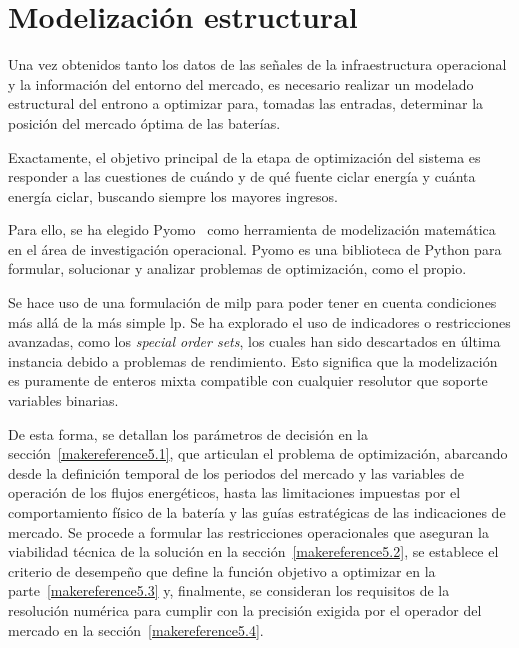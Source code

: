 
\cleardoublepage%

\chapter{Modelización estructural}%
\label{makereference5}

Una vez obtenidos tanto los datos de las señales de la infraestructura operacional y la información del entorno del mercado, es necesario realizar un modelado estructural del entrono a optimizar para, tomadas las entradas, determinar la posición del mercado óptima de las baterías.

Exactamente, el objetivo principal de la etapa de optimización del sistema es responder a las cuestiones de cuándo y de qué fuente ciclar energía y cuánta energía ciclar, buscando siempre los mayores ingresos.

Para ello, se ha elegido Pyomo~\cite{pyomo2025optimization} como herramienta de modelización matemática en el área de investigación operacional. Pyomo es una biblioteca de Python para formular, solucionar y analizar problemas de optimización, como el propio.

Se hace uso de una formulación de \gls{milp} para poder tener en cuenta condiciones más allá de la más simple \gls{lp}. Se ha explorado el uso de indicadores o restricciones avanzadas, como los \textit{special order sets}, los cuales han sido descartados en última instancia debido a problemas de rendimiento. Esto significa que la modelización es puramente de enteros mixta compatible con cualquier resolutor que soporte variables binarias.

De esta forma, se detallan los parámetros de decisión en la sección~\ref{makereference5.1}, que articulan el problema de optimización, abarcando desde la definición temporal de los periodos del mercado y las variables de operación de los flujos energéticos, hasta las limitaciones impuestas por el comportamiento físico de la batería y las guías estratégicas de las indicaciones de mercado. Se procede a formular las restricciones operacionales que aseguran la viabilidad técnica de la solución en la sección~\ref{makereference5.2}, se establece el criterio de desempeño que define la función objetivo a optimizar en la parte~\ref{makereference5.3} y, finalmente, se consideran los requisitos de la resolución numérica para cumplir con la precisión exigida por el operador del mercado en la sección~\ref{makereference5.4}.


